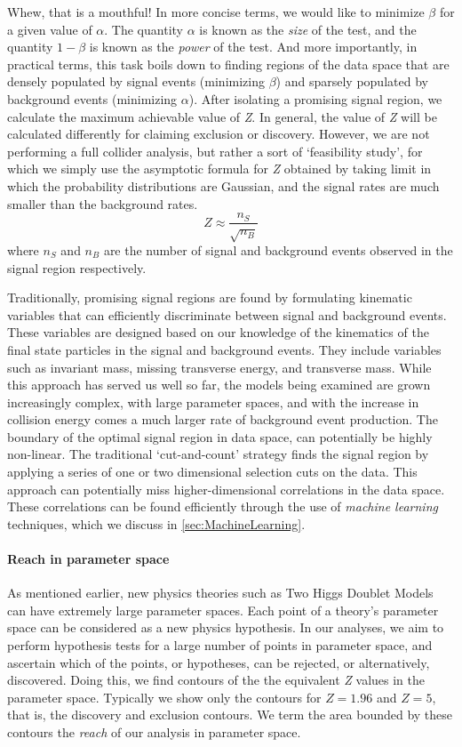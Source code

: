 Whew, that is a mouthful! In more concise terms, we would like to minimize $\beta$ for a given value of $\alpha$. The quantity $\alpha$ is known as the \emph{size} of the test, and the quantity $1-\beta$ is known as the \emph{power} of the test. And more importantly, in practical terms, this task boils down to finding regions of the data space that are densely populated by signal events (minimizing $\beta$) and sparsely populated by background events (minimizing $\alpha$). After isolating a promising signal region, we calculate the maximum achievable value of \emph{Z}. In general, the value of \emph{Z} will be calculated differently for claiming exclusion or discovery. However, we are not performing a full collider analysis, but rather a sort of `feasibility study', for which we simply use the asymptotic formula for \emph{Z} obtained by taking limit in which the probability distributions are Gaussian, and the signal rates are much smaller than the background rates.
\[Z \approx \frac{n_S}{\sqrt{n_B}}\]
where $n_S$ and $n_B$ are the number of signal and background events observed in the signal region respectively.

Traditionally, promising signal regions are found by formulating kinematic variables that can efficiently discriminate between signal and background events. These variables are designed based on our knowledge of the kinematics of the final state particles in the signal and background events. They include variables such as invariant mass, missing transverse energy, and transverse mass. While this approach has served us well so far, the models being examined are grown increasingly complex, with large parameter spaces, and with the increase in collision energy comes a much larger rate of background event production. The boundary of the optimal signal region in data space, can potentially be highly non-linear. The traditional `cut-and-count' strategy finds the signal region by applying a series of one or two dimensional selection cuts on the data. This approach can potentially miss higher-dimensional correlations in the data space. These correlations can be found efficiently through the use of \emph{machine learning} techniques, which we discuss in \autoref{sec:MachineLearning}.

\paragraph{Reach in parameter space} As mentioned earlier, new physics theories such as Two Higgs Doublet Models can have extremely large parameter spaces. Each point of a theory's parameter space can be considered as a new physics hypothesis. In our analyses, we aim to perform hypothesis tests for a large number of points in parameter space, and ascertain which of the points, or hypotheses, can be rejected, or alternatively, discovered. Doing this, we find contours of the the equivalent \emph{Z} values in the parameter space. Typically we show only the contours for $Z = 1.96$ and $Z=5$, that is, the discovery and exclusion contours. We term the area bounded by these contours the \emph{reach} of our analysis in parameter space. 

